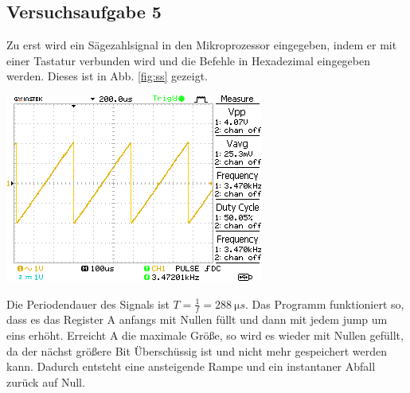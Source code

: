 \documentclass[10pt]{article}
\newenvironment{Figure}
  {\par\medskip\noindent\minipage{\linewidth}}
  {\endminipage\par\medskip}
\begin{document}
\begin{multicols}{2}
	\subsection{Versuchsaufgabe 5}
  Zu erst wird ein Sägezahlsignal in den Mikroprozessor eingegeben, indem er mit einer Tastatur verbunden wird und die Befehle in Hexadezimal eingegeben werden. Dieses ist in Abb. \ref{fig:ss} gezeigt.
	\begin{Figure}
		\centering\includegraphics{../data/DS0007.png}
    \label{fig:ss}
	\end{Figure}
	Die Periodendauer des Signals ist $T=\frac{1}{f}=\SI{288}{\micro s}$.
	Das Programm funktioniert so, dass es das Register A anfangs mit Nullen füllt und dann mit jedem jump um eins erhöht.
	Erreicht A die maximale Größe, so wird es wieder mit Nullen gefüllt, da der nächst größere Bit Überschüssig ist und nicht mehr gespeichert werden kann.
	Dadurch entsteht eine ansteigende Rampe und ein instantaner Abfall zurück auf Null.


\end{multicols}
\end{document}
